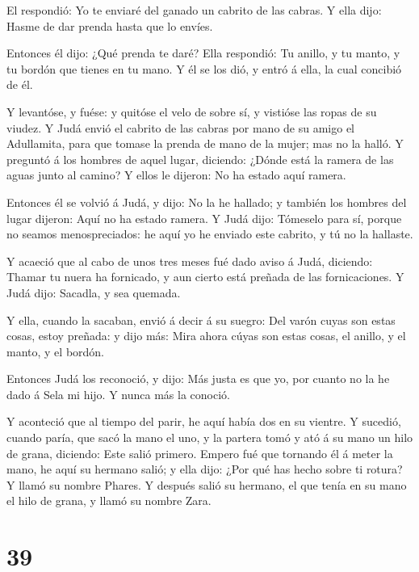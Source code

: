  El respondió: Yo te enviaré del ganado un cabrito de las
cabras. Y ella dijo: Hasme de dar prenda hasta que lo envíes.

 Entonces él dijo: ¿Qué prenda te daré? Ella respondió: Tu
anillo, y tu manto, y tu bordón que tienes en tu mano. Y él se los dió,
y entró á ella, la cual concibió de él.

 Y levantóse, y fuése: y quitóse el velo de sobre sí, y
vistióse las ropas de su viudez.  Y Judá envió el cabrito
de las cabras por mano de su amigo el Adullamita, para que tomase la
prenda de mano de la mujer; mas no la halló.  Y preguntó á
los hombres de aquel lugar, diciendo: ¿Dónde está la ramera de las aguas
junto al camino? Y ellos le dijeron: No ha estado aquí ramera.

 Entonces él se volvió á Judá, y dijo: No la he hallado; y
también los hombres del lugar dijeron: Aquí no ha estado ramera.
 Y Judá dijo: Tómeselo para sí, porque no seamos
menospreciados: he aquí yo he enviado este cabrito, y tú no la hallaste.

 Y acaeció que al cabo de unos tres meses fué dado aviso á
Judá, diciendo: Thamar tu nuera ha fornicado, y aun cierto está preñada
de las fornicaciones. Y Judá dijo: Sacadla, y sea quemada.

 Y ella, cuando la sacaban, envió á decir á su suegro: Del
varón cuyas son estas cosas, estoy preñada: y dijo más: Mira ahora cúyas
son estas cosas, el anillo, y el manto, y el bordón.

 Entonces Judá los reconoció, y dijo: Más justa es que yo,
por cuanto no la he dado á Sela mi hijo. Y nunca más la conoció.

 Y aconteció que al tiempo del parir, he aquí había dos en
su vientre.  Y sucedió, cuando paría, que sacó la mano el
uno, y la partera tomó y ató á su mano un hilo de grana, diciendo: Este
salió primero.  Empero fué que tornando él á meter la mano,
he aquí su hermano salió; y ella dijo: ¿Por qué has hecho sobre ti
rotura? Y llamó su nombre Phares.  Y después salió su
hermano, el que tenía en su mano el hilo de grana, y llamó su nombre
Zara.

\hypertarget{section-38}{%
\section{39}\label{section-38}}

